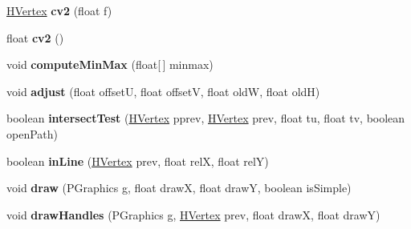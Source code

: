 \begin{DoxyCompactItemize}
\item 
\hypertarget{classhype_1_1extended_1_1util_1_1_h_vertex_a11958cb10aab54c1c838b40643125ec5}{\hyperlink{classhype_1_1extended_1_1util_1_1_h_vertex}{H\-Vertex} {\bfseries cv2} (float f)}\label{classhype_1_1extended_1_1util_1_1_h_vertex_a11958cb10aab54c1c838b40643125ec5}

\item 
\hypertarget{classhype_1_1extended_1_1util_1_1_h_vertex_a895ba4dc0642f79c08023d88240cc479}{float {\bfseries cv2} ()}\label{classhype_1_1extended_1_1util_1_1_h_vertex_a895ba4dc0642f79c08023d88240cc479}

\item 
\hypertarget{classhype_1_1extended_1_1util_1_1_h_vertex_a37b5b52823a1f437b81c8d105291ce5e}{void {\bfseries compute\-Min\-Max} (float\mbox{[}$\,$\mbox{]} minmax)}\label{classhype_1_1extended_1_1util_1_1_h_vertex_a37b5b52823a1f437b81c8d105291ce5e}

\item 
\hypertarget{classhype_1_1extended_1_1util_1_1_h_vertex_a42f48ccf5dee77bb918b618da5185e0f}{void {\bfseries adjust} (float offset\-U, float offset\-V, float old\-W, float old\-H)}\label{classhype_1_1extended_1_1util_1_1_h_vertex_a42f48ccf5dee77bb918b618da5185e0f}

\item 
\hypertarget{classhype_1_1extended_1_1util_1_1_h_vertex_ae6dc06e25a734684f601becf26d701bd}{boolean {\bfseries intersect\-Test} (\hyperlink{classhype_1_1extended_1_1util_1_1_h_vertex}{H\-Vertex} pprev, \hyperlink{classhype_1_1extended_1_1util_1_1_h_vertex}{H\-Vertex} prev, float tu, float tv, boolean open\-Path)}\label{classhype_1_1extended_1_1util_1_1_h_vertex_ae6dc06e25a734684f601becf26d701bd}

\item 
\hypertarget{classhype_1_1extended_1_1util_1_1_h_vertex_ad21282314770aa4083fe324f1818812b}{boolean {\bfseries in\-Line} (\hyperlink{classhype_1_1extended_1_1util_1_1_h_vertex}{H\-Vertex} prev, float rel\-X, float rel\-Y)}\label{classhype_1_1extended_1_1util_1_1_h_vertex_ad21282314770aa4083fe324f1818812b}

\item 
\hypertarget{classhype_1_1extended_1_1util_1_1_h_vertex_ac1def2460d3adcf25f6da01d208b865c}{void {\bfseries draw} (P\-Graphics g, float draw\-X, float draw\-Y, boolean is\-Simple)}\label{classhype_1_1extended_1_1util_1_1_h_vertex_ac1def2460d3adcf25f6da01d208b865c}

\item 
\hypertarget{classhype_1_1extended_1_1util_1_1_h_vertex_abe89f4ef78856a3199218b94bc0edb5d}{void {\bfseries draw\-Handles} (P\-Graphics g, \hyperlink{classhype_1_1extended_1_1util_1_1_h_vertex}{H\-Vertex} prev, float draw\-X, float draw\-Y)}\label{classhype_1_1extended_1_1util_1_1_h_vertex_abe89f4ef78856a3199218b94bc0edb5d}

\end{DoxyCompactItemize}
